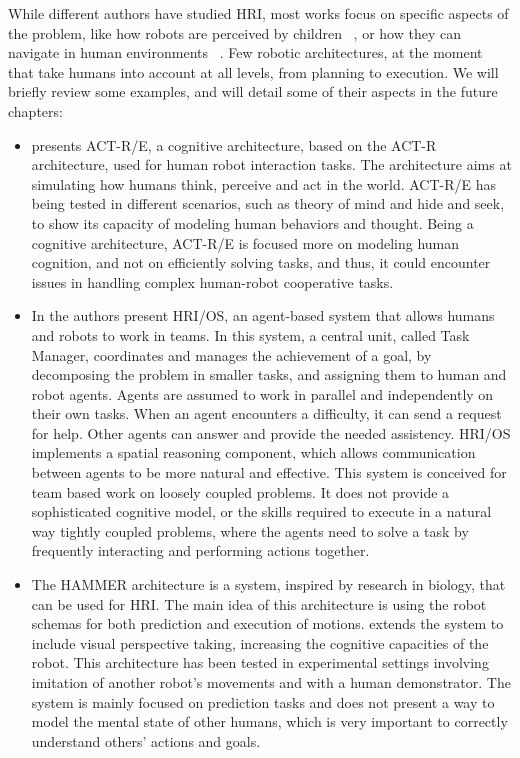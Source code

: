 While different authors have studied HRI, most works focus on specific aspects of the problem, like how robots are perceived by children ~\cite{kozima2007children}, or how they can navigate in human environments ~\cite{sisbot2007human}. Few robotic architectures, at the moment that take humans into account at all levels, from planning to execution. We will briefly review some examples, and will detail some of their aspects in the future chapters:
\begin{itemize} 
\item \cite{trafton2013act} presents ACT-R/E, a cognitive architecture, based
on the ACT-R architecture, used for human robot interaction tasks. The
architecture aims at simulating how humans think, perceive and act in
the world. ACT-R/E has being tested in different scenarios, such as
theory of mind and hide and seek, to show its capacity of modeling
human behaviors and thought. Being a cognitive architecture, ACT-R/E is focused more on modeling human 
cognition, and not on efficiently solving tasks, and thus, it could encounter issues in handling complex human-robot cooperative tasks. 

\item In \cite{Fong_2006} the authors present  HRI/OS, an agent-based system
that allows humans and robots to work in teams. In this system, a central unit, called Task Manager, coordinates and manages the achievement of a goal, by decomposing the problem in smaller tasks, and assigning them to human and robot agents. Agents are assumed to work in parallel and independently on their own tasks. When an agent encounters a difficulty, it can send a request for help. Other agents can answer and provide the needed assistency. HRI/OS implements a spatial reasoning component, which allows communication between agents to be more natural and effective. This system is conceived for team based work on loosely coupled problems. It does not provide a sophisticated cognitive model, or the skills required to execute in a natural way tightly coupled problems, where the agents need to solve a task by frequently interacting and performing actions together. 

\item  The HAMMER architecture \cite{demiris2003distributed} is a system, inspired by
research in biology, that can be used for HRI. The main idea of this architecture is
using the robot schemas for both prediction and execution of motions. \cite{johnson2005perceptual} extends the system to include visual perspective taking, increasing the cognitive capacities of the robot.  This architecture has been tested in experimental settings involving imitation of another robot's movements and with a human demonstrator.  The system is mainly focused on prediction tasks and does not present a way to model the mental state of other humans, which is very important to correctly understand others' actions and goals.


\end{itemize}
